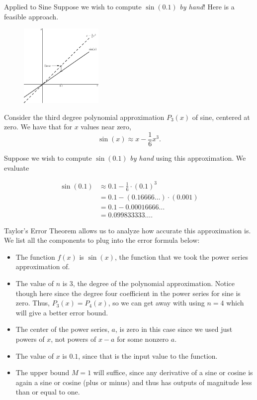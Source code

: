 \begin{example}{ Applied to Sine}
Suppose we wish to compute $\sin(0.1)$ \emph{by hand}!  Here is a feasible approach.

\begin{figure}
    	\centering
		\includegraphics[height=150px]{ChapterPowerSeries/Figures/ErrorSine}
\end{figure}

Consider the third degree polynomial approximation $P_3(x)$ of sine, centered at zero.  We have that for $x$ values near zero, $$\sin(x)\approx x-\frac{1}{6}x^3. $$

Suppose we wish to compute $\sin(0.1)$ \emph{by hand} using this approximation.  We evaluate

\begin{align*}
\sin(0.1)&\approx 0.1-\frac{1}{6}\cdot (0.1)^3 \\
&= 0.1-(0.16666\ldots)\cdot(0.001) \\
&= 0.1-0.00016666\ldots \\
&= 0.099833333\ldots.
\end{align*}

Taylor's Error Theorem allows us to analyze how accurate this approximation is.  We list all the components to plug into the error formula below:
\begin{itemize}
\item The function $f(x)$ is $\sin(x)$, the function that we took the power series approximation of.
\item The value of $n$ is 3, the degree of the polynomial approximation.  Notice though here since the degree four coefficient in the power series for sine is zero.  Thus, $P_3(x)=P_4(x)$, so we can get away with using $n=4$ which will give a better error bound. 
\item The center of the power series, $a$, is zero in this case since we used just powers of $x$, not powers of $x-a$ for some nonzero $a$.
\item The value of $x$ is $0.1$, since that is the input value to the function.
\item The upper bound $M=1$ will suffice, since any derivative of a sine or cosine is again a sine or cosine (plus or minus) and thus has outputs of magnitude less than or equal to one.
\end{itemize}


\end{example}
